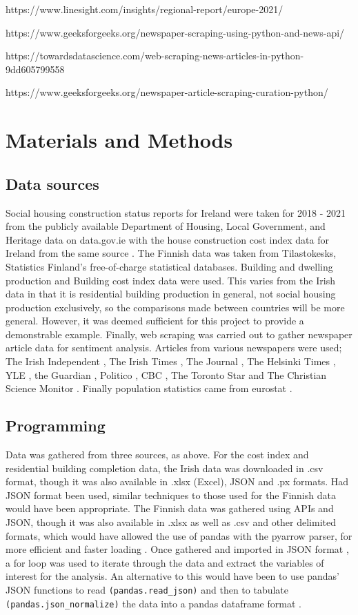 \documentclass[hidelinks,12pt,oneside]{report} %
\begin{document}
https://www.linesight.com/insights/regional-report/europe-2021/

https://www.geeksforgeeks.org/newspaper-scraping-using-python-and-news-api/

https://towardsdatascience.com/web-scraping-news-articles-in-python-9dd605799558

https://www.geeksforgeeks.org/newspaper-article-scraping-curation-python/
\chapter{Materials and Methods}
\section{Data sources}
Social housing construction status reports for Ireland were taken for 2018 - 2021 from the publicly available Department of Housing, Local Government, and Heritage data on data.gov.ie \citep{Social} with the house construction cost index data for Ireland from the same source \citep{construction}. The Finnish data was taken from Tilastokesks, Statistics Finland’s free-of-charge statistical databases. Building and dwelling production \citep{12fy} and Building cost index \citep{11na} data were used. This varies from the Irish data in that it is residential building production in general, not social housing production exclusively, so the comparisons made between countries will be more general. However, it was deemed sufficient for this project to provide a demonstrable example. Finally, web scraping was carried out to gather newspaper article data for sentiment analysis. Articles from various newspapers were used; The Irish Independent \citep{TII}, The Irish Times \citep{TIT}, The Journal \citep{TJ}, The Helsinki Times \citep{THT}, YLE \citep{YLE}, the Guardian \citep{TG, TG2}, Politico \citep{P}, CBC \citep{CBC, CBC2}, The Toronto Star \citep{TS} and The Christian Science Monitor \citep{CS}. Finally population statistics came from eurostat \citep{eurostat}.

\section{Programming}
Data was gathered from three sources, as above. For the cost index and residential building completion data, the Irish data was downloaded in .csv format, though it was also available in .xlsx (Excel), JSON and .px formats. Had JSON format been used, similar techniques to those used for the Finnish data would have been appropriate. The Finnish data was gathered using APIs and JSON, though it was also available in .xlsx as well as .csv and other delimited formats, which would have allowed the use of pandas with the pyarrow parser, for more efficient and faster loading \citep{pyarrow}. Once gathered and imported in JSON format \citep{PxWeb}, a for loop was used to iterate through the data and extract the variables of interest for the analysis. An alternative to this would have been to use pandas' JSON functions to read  
\verb|(pandas.read_json)| \citep{read} and then to tabulate \verb|(pandas.json_normalize)| the data into a pandas dataframe format \citep{norm}.
\end{document}

